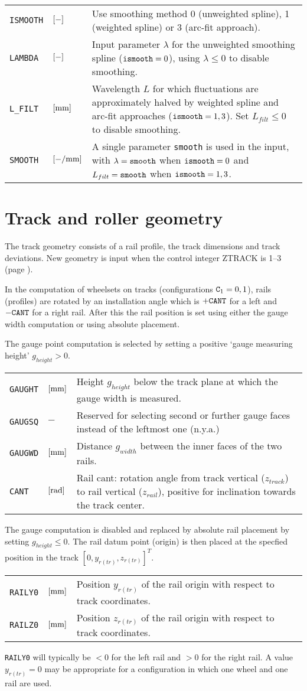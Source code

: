 \documentclass[12pt]{report}
\newenvironment{inputvars}{\vspace{0.4\baselineskip}%

\begin{tabular}{>{\raggedright}p{22mm}p{19mm}p{113mm}}}{
\end{tabular}

}
\newcommand{\inpvar}[3]{{\small\tt #1} & $#2$ & #3 \\[1ex]}
\begin{document}
\begin{inputvars}
\inpvar{ISMOOTH}{\bunit{-}}{Use smoothing method 0 (unweighted spline), 1
        (weighted spline) or 3 (arc-fit approach).}
\inpvar{LAMBDA}{\bunit{-}}{Input parameter $\lambda$ for the unweighted
        smoothing spline (${\tt ismooth}=0$), using $\lambda\le 0$ to
        disable smoothing.}
\inpvar{L\_FILT}{\bunit{mm}}{Wavelength $L$ for which fluctuations are
        approximately halved by weighted spline and arc-fit approaches
        (${\tt ismooth}=1, 3$). Set $L_{filt}\le 0$ to disable smoothing.}
\inpvar{SMOOTH}{\bunit{-/mm}}{A single parameter {\tt smooth} is used in
        the input, with $\lambda={\tt smooth}$ when ${\tt ismooth}=0$ and
        $L_{filt}={\tt smooth}$ when ${\tt ismooth}=1, 3$.}
\end{inputvars}

\section{Track and roller geometry}
\label{sec:track_geom}

The track geometry consists of a rail profile, the track dimensions
and track deviations. New geometry is input when the control integer
ZTRACK is 1--3 (page \pageref{z1-digit}).

In the computation of wheelsets on tracks (configurations ${\tt C}_1=0,
1$), rails (profiles) are rotated by an installation angle which is $+{\tt
CANT}$ for a left and $-{\tt CANT}$ for a right rail. 
After this the rail position is set using either the gauge width
computation or using absolute placement.

The gauge point computation is selected by setting a positive 
`gauge measuring height' $g_{height}>0$.
\begin{inputvars}
\inpvar{GAUGHT}{\bunit{mm}}{Height $g_{height}$ below the track plane at which
        the gauge width is measured.}
\inpvar{GAUGSQ}{-}{Reserved for selecting second or further gauge faces
        instead of the leftmost one (n.y.a.)}
\inpvar{GAUGWD}{\bunit{mm}}{Distance $g_{width}$ between the inner faces of the
        two rails.}
\inpvar{CANT}{\bunit{rad}}{Rail cant: rotation angle from track vertical
        ($z_{track}$) to rail vertical ($z_{rail}$), positive for
        inclination towards the track center.}
\end{inputvars}
The gauge computation is disabled and replaced by absolute rail placement
by setting $g_{height}\le 0$. The rail datum point (origin) is then placed
at the specfied position in the track $[0, y_{r(tr)}, z_{r(tr)}]^T$. 
\begin{inputvars}
\inpvar{RAILY0}{\bunit{mm}}{Position $y_{r(tr)}$ of the rail origin with
        respect to track coordinates.}
\inpvar{RAILZ0}{\bunit{mm}}{Position $z_{r(tr)}$ of the rail origin with
        respect to track coordinates.}
\end{inputvars}
{\tt RAILY0} will typically be $<0$ for the left rail and $>0$ for
the right rail. A value $y_{r(tr)}=0$ may be appropriate for a
configuration in which one wheel and one rail are used.
\end{document}
